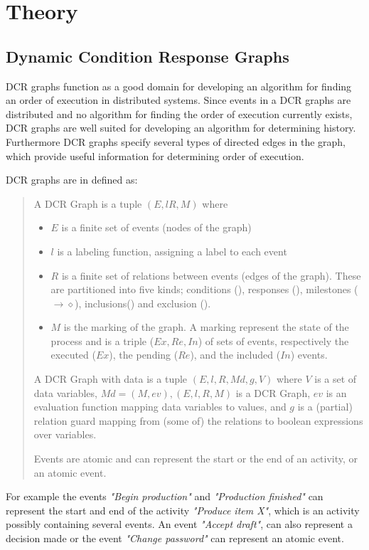 \chapter{Theory}\label{chap:theory}
	\section{Dynamic Condition Response Graphs}
	DCR graphs function as a good domain for developing an algorithm for finding an order of execution in distributed systems. Since events in a DCR graphs are distributed and no algorithm for finding the order of execution currently exists, DCR graphs are well suited for developing an algorithm for determining history. 
	Furthermore DCR graphs specify several types of directed edges in the graph, which provide useful information for determining order of execution.
	
	\newpar DCR graphs are in \cite{} defined as: 
		\begin{quotation}	
		A DCR Graph is a tuple $(E, l R, M)$ where
		\begin{itemize}
			\item $E$ is a finite set of events (nodes of the graph)
			\item $l$ is a labeling function, assigning a label to each event
			\item $R$ is a finite set of relations between events (edges of the graph). These are partitioned into five kinds; conditions (\condition), responses (\response), milestones ($\rightarrow\!\!\!\diamond$), inclusions(\inclusion) and exclusion (\exclusion).
			\item $M$ is the marking of the graph. A marking represent the state of the process and is a triple ($Ex,Re,In$) of sets of events, respectively the executed ($Ex$), the pending ($Re$), and the included ($In$) events.
		\end{itemize}
		A DCR Graph with data is a tuple $(E,l,R,Md,g,V)$ where $V$ is a set of data variables, $Md = (M,ev), (E,l,R,M)$ is a DCR Graph, $ev$ is an evaluation function mapping data variables to values, and $g$ is a (partial) relation guard mapping from (some of) the relations to boolean expressions over variables.
		
		Events are atomic and can represent the start or the end of an activity, or an atomic event. 
	\end{quotation}
	
	\newpar For example the events \textit{"Begin production"} and \textit{"Production finished"} can represent the start and end of the activity \textit{"Produce item X"}, which is an activity possibly containing several events. An event \textit{"Accept draft"}, can also represent a decision made or the event \textit{"Change password"} can represent an atomic event.
	
